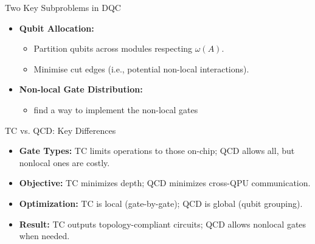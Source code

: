 \documentclass{beamer}
\begin{document}
	\begin{frame}{Two Key Subproblems in DQC}
		\begin{itemize}
			\item \textbf{Qubit Allocation: }
			\begin{itemize}
				\item Partition qubits across modules respecting $\omega(A)$.
				\item Minimise cut edges (i.e., potential non-local interactions).
			\end{itemize}
			\item \textbf{Non-local Gate Distribution:}
			\begin{itemize}
				\item find a way to implement the non-local gates
			\end{itemize}
		\end{itemize}
%		
	\end{frame}
	
	
	\begin{frame}{TC vs. QCD: Key Differences}
		\begin{itemize}
			\item \textbf{Gate Types:} TC limits operations to those on-chip; QCD allows all, but nonlocal ones are costly.
			\item \textbf{Objective:} TC minimizes depth; QCD minimizes cross-QPU communication.
			\item \textbf{Optimization:} TC is local (gate-by-gate); QCD is global (qubit grouping).
			\item \textbf{Result:} TC outputs topology-compliant circuits; QCD allows nonlocal gates when needed.
		\end{itemize}
	\end{frame}
	
\end{document}
